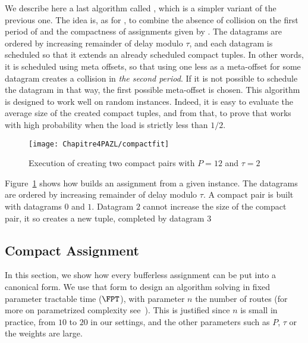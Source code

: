 We describe here a last algorithm called \compactfit, which is a simpler variant of the previous one. The idea is, as for \compactpair, to combine the absence of collision on the first period of \metaoffset and the compactness of assignments given by \firstfit.
The datagrams are ordered by increasing remainder of delay modulo $\tau$, and each datagram is scheduled so that 
it extends an already scheduled compact tuples. In other words, it is scheduled using meta offsets, so that using one less as a meta-offset for some datagram creates a collision in \emph{the second period}. If it is not possible to schedule the datagram in that way, the first possible meta-offset is chosen. This algorithm is designed to work well on random instances. Indeed, it 
is easy to evaluate the average size of the created compact tuples, and from that, to prove that \compactfit works with high probability when the load is strictly less than $1/2$.
\begin{figure}[h]
 \begin{center}
\texttt{[image: Chapitre4PAZL/compactfit]}
\end{center}
\caption{Execution of \compactfit creating two compact pairs with $P=12$ and $\tau =2$}
\label{fig:compactfit}
\end{figure}
Figure~\ref{fig:compactfit} shows how \compactfit builds an assignment from a given instance. The datagrams are ordered by increasing remainder of delay modulo $\tau$. A compact pair is built with datagrams $0$ and $1$. Datagram $2$ cannot increase the size of the compact pair, it so creates a new tuple, completed by datagram $3$



\subsection{Compact Assignment}

In this section, we show how every bufferless assignment can be put into a canonical form.
We use that form to design an algorithm solving \pma in fixed parameter tractable time ($\FPT$), with parameter $n$ the number of routes (for more on parametrized complexity see~\cite{downey2012parameterized}). This is justified since $n$ is small in practice, from $10$ to $20$ in our settings, and the other parameters such as $P$, $\tau$ or the weights are large.


